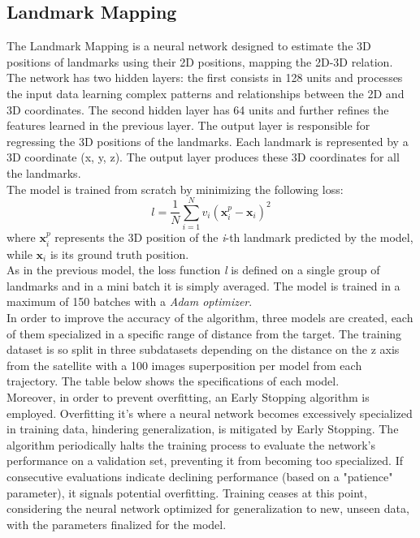 \documentclass[conference]{IEEEtran}
\begin{document}
\subsection{Landmark Mapping}
The Landmark Mapping is a neural network designed to estimate the 3D positions of landmarks using their 2D positions, mapping the 2D-3D relation.\\
The network has two hidden layers: the first consists in 128 units and processes the input data learning complex patterns and relationships between the 2D and 3D coordinates. The second hidden layer has 64 units and further refines the features learned in the previous layer. The output layer is responsible for regressing the 3D positions of the landmarks. Each landmark is represented by a 3D coordinate (x, y, z). The output layer produces these 3D coordinates for all the landmarks.\\
The model is trained from scratch by minimizing the following loss:
\[l = \frac{1}{N}\sum_{i=1}^N v_i(\textbf{x}_{i}^p - \textbf{x}_{i})^2\]
where \(\textbf{x}_{i}^p\) represents the 3D position of the \textit{i}-th landmark predicted by the model, while \(\textbf{x}_{i}\) is its ground truth position.\\
As in the previous model, the loss function \textit{l} is defined on a single group of landmarks and in a mini batch it is simply averaged. The model is trained in a maximum of 150 batches with a \textit{Adam optimizer}.\\
In order to improve the accuracy of the algorithm, three models are created, each of them specialized in a specific range of distance from the target.
The training dataset is so split in three subdatasets depending on the distance on the z axis from the satellite with a 100 images superposition per model from each trajectory. The table below shows the specifications of each model.\\
Moreover, in order to prevent overfitting, an Early Stopping algorithm is employed. Overfitting it's where a neural network becomes excessively specialized in training data, hindering generalization, is mitigated by Early Stopping. The algorithm periodically halts the training process to evaluate the network's performance on a validation set, preventing it from becoming too specialized. If consecutive evaluations indicate declining performance (based on a "patience" parameter), it signals potential overfitting. Training ceases at this point, considering the neural network optimized for generalization to new, unseen data, with the parameters finalized for the model.
\end{document}
